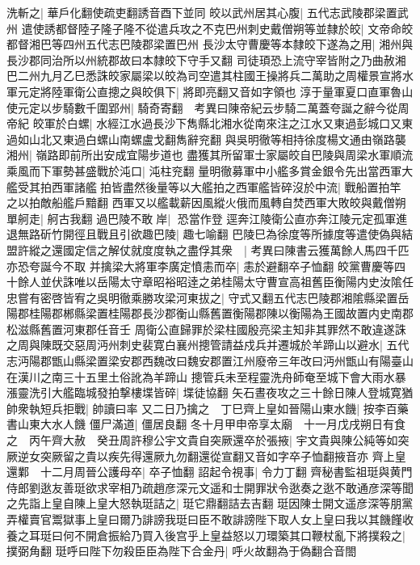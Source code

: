 洗斬之|{
	華戶化翻使疏吏翻誘音酉下並同}
皎以武州居其心腹|{
	五代志武陵郡梁置武州}
遣使誘都督陸子隆子隆不從遣兵攻之不克巴州刺史戴僧朔等並隸於皎|{
	文帝命皎都督湘巴等四州五代志巴陵郡梁置巴州}
長沙太守曹慶等本隸皎下遂為之用|{
	湘州與長沙郡同治所以州統郡故曰本隸皎下守手又翻}
司徒頊恐上流守宰皆附之乃曲赦湘巴二州九月乙巳悉誅皎家屬梁以皎為司空遣其柱國王操將兵二萬助之周權景宣將水軍元定將陸軍衛公直摠之與皎俱下|{
	將即亮翻又音如字領也}
淳于量軍夏口直軍魯山使元定以步騎數千圍郢州|{
	騎奇寄翻　考異曰陳帝紀云步騎二萬蓋夸誕之辭今從周帝紀}
皎軍於白螺|{
	水經江水過長沙下雋縣北湘水從南來注之江水又東過彭城口又東過如山北又東過白螺山南螺盧戈翻雋辭兖翻}
與吳明徹等相持徐度楊文通由嶺路襲湘州|{
	嶺路即前所出安成宜陽步道也}
盡獲其所留軍士家屬皎自巴陵與周梁水軍順流乘風而下軍勢甚盛戰於沌口|{
	沌柱兖翻}
量明徹募軍中小艦多賞金銀令先出當西軍大艦受其拍西軍諸艦拍皆盡然後量等以大艦拍之西軍艦皆碎沒於中流|{
	戰船置拍竿之以拍敵船艦戶黯翻}
西軍又以艦載薪因風縱火俄而風轉自焚西軍大敗皎與戴僧朔單舸走|{
	舸古我翻}
過巴陵不敢岸|{
	恐當作登}
逕奔江陵衛公直亦奔江陵元定孤軍進退無路斫竹開徑且戰且引欲趣巴陵|{
	趣七喻翻}
巴陵巳為徐度等所據度等遣使偽與結盟許縱之還國定信之解仗就度度執之盡俘其衆　|{
	考異曰陳書云獲萬餘人馬四千匹亦恐夸誕今不取}
并擒梁大將軍李廣定憤恚而卒|{
	恚於避翻卒子恤翻}
皎黨曹慶等四十餘人並伏誅唯以岳陽太守章昭裕昭逹之弟桂陽太守曹宣高祖舊臣衡陽内史汝隂任忠嘗有密啓皆宥之吳明徹乘勝攻梁河東拔之|{
	守式又翻五代志巴陵郡湘隂縣梁置岳陽郡桂陽郡郴縣梁置桂陽郡長沙郡衡山縣舊置衡陽郡陳以衡陽為王國故置内史南郡松滋縣舊置河東郡任音壬}
周衛公直歸罪於梁柱國殷亮梁主知非其罪然不敢違遂誅之周與陳既交惡周沔州刺史裴寛白襄州摠管請益戍兵并遷城於羊蹄山以避水|{
	五代志沔陽郡甑山縣梁置梁安郡西魏改曰魏安郡置江州廢帝三年改曰沔州甑山有陽臺山在漢川之南三十五里土俗訛為羊蹄山}
摠管兵未至程靈洗舟師奄至城下會大雨水暴漲靈洗引大艦臨城發拍撃樓堞皆碎|{
	堞徒協翻}
矢石晝夜攻之三十餘日陳人登城寛猶帥衆執短兵拒戰|{
	帥讀曰率}
又二日乃擒之　丁巳齊上皇如晉陽山東水饑|{
	按李百藥書山東大水人饑}
僵尸滿道|{
	僵居良翻}
冬十月甲申帝享太廟　十一月戊戌朔日有食之　丙午齊大赦　癸丑周許穆公宇文貴自突厥還卒於張掖|{
	宇文貴與陳公純等如突厥逆女突厥留之貴以疾先得還厥九勿翻還從宣翻又音如字卒子恤翻掖音亦}
齊上皇還鄴　十二月周晉公護母卒|{
	卒子恤翻}
詔起令視事|{
	令力丁翻}
齊秘書監祖珽與黄門侍郎劉逖友善珽欲求宰相乃疏趙彦深元文遥和士開罪狀令逖奏之逖不敢通彦深等聞之先詣上皇自陳上皇大怒執珽詰之|{
	珽它鼎翻詰去吉翻}
珽因陳士開文遥彦深等朋黨弄權賣官鬻獄事上皇曰爾乃誹謗我珽曰臣不敢誹謗陛下取人女上皇曰我以其饑饉收養之耳珽曰何不開倉振給乃買入後宫乎上皇益怒以刀環築其口鞭杖亂下將撲殺之|{
	撲弼角翻}
珽呼曰陛下勿殺臣臣為陛下合金丹|{
	呼火故翻為于偽翻合音閤}
